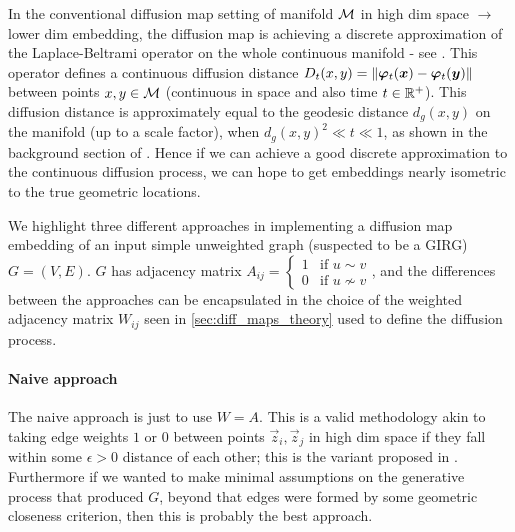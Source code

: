 In the conventional diffusion map setting of manifold $\mathcal{M}$ in high dim space $\to$ lower dim embedding, the diffusion map is achieving a discrete approximation of the Laplace-Beltrami operator on the whole continuous manifold - see \cite{singer2006graph}. This operator defines a continuous diffusion distance $D_t(x, y) = \left\lVert \bm{\varphi}_t(\bm{x}) - \bm{\varphi}_t(\bm{y})\right\rVert$ between points $x, y \in \mathcal{M}$ (continuous in space and also time $t \in \mathbb{R}^+$). This diffusion distance is approximately equal to the geodesic distance $d_g(x, y)$ on the manifold (up to a scale factor), when $d_g(x, y)^2 \ll t \ll 1$, as shown in the background section of \cite{berry2018iterated}. Hence if we can achieve a good discrete approximation to the continuous diffusion process, we can hope to get embeddings nearly isometric to the true geometric locations.


We highlight three different approaches in implementing a diffusion map embedding of an input simple unweighted graph (suspected to be a GIRG) $G=(V, E)$.
$G$ has adjacency matrix $A_{ij} = \begin{cases} 1 & \text{if } u \sim v \\ 0 & \text{if } u \nsim v \end{cases}$, and the differences between the approaches can be encapsulated in the choice of the weighted adjacency matrix $W_{ij}$ seen in \cref{sec:diff_maps_theory} used to define the diffusion process.

\paragraph{Naive approach}
The naive approach is just to use $W = A$. This is a valid methodology akin to taking edge weights $1$ or $0$ between points $\vec{z}_i, \vec{z}_j$ in high dim space if they fall within some $\epsilon > 0$ distance of each other; this is the  variant proposed in \cite{belkin2001laplacian}. Furthermore if we wanted to make minimal assumptions on the generative process that produced $G$, beyond that edges were formed by some geometric closeness criterion, then this is probably the best approach.

